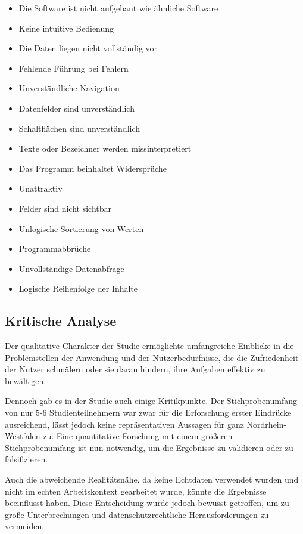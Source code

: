 \begin{itemize}
     \item Die Software ist nicht aufgebaut wie ähnliche Software
     \item Keine intuitive Bedienung
     \item Die Daten liegen nicht vollständig vor
     \item Fehlende Führung bei Fehlern
     \item Unverständliche Navigation
     \item Datenfelder sind unverständlich
     \item Schaltflächen sind unverständlich
     \item Texte oder Bezeichner werden missinterpretiert
     \item Das Programm beinhaltet Widersprüche
     \item Unattraktiv
     \item Felder sind nicht sichtbar
     \item Unlogische Sortierung von Werten
     \item Programmabbrüche
     \item Unvollständige Datenabfrage
     \item Logische Reihenfolge der Inhalte
\end{itemize}


\subsection{Kritische Analyse}
Der qualitative Charakter der Studie ermöglichte umfangreiche Einblicke in die Problemstellen der Anwendung und der Nutzerbedürfnisse, die die Zufriedenheit der Nutzer schmälern oder sie daran hindern, ihre Aufgaben effektiv zu bewältigen. 

Dennoch gab es in der Studie auch einige Kritikpunkte. Der Stichprobenumfang von nur 5-6 Studienteilnehmern war zwar für die Erforschung erster Eindrücke ausreichend, lässt jedoch keine repräsentativen Aussagen für ganz Nordrhein-Westfalen zu. Eine quantitative Forschung mit einem größeren Stichprobenumfang ist nun notwendig, um die Ergebnisse zu validieren oder zu falsifizieren.

Auch die abweichende Realitätsnähe, da keine Echtdaten verwendet wurden und nicht im echten Arbeitskontext gearbeitet wurde, könnte die Ergebnisse beeinflusst haben. Diese Entscheidung wurde jedoch bewusst getroffen, um zu große Unterbrechungen und datenschutzrechtliche Herausforderungen zu vermeiden.

